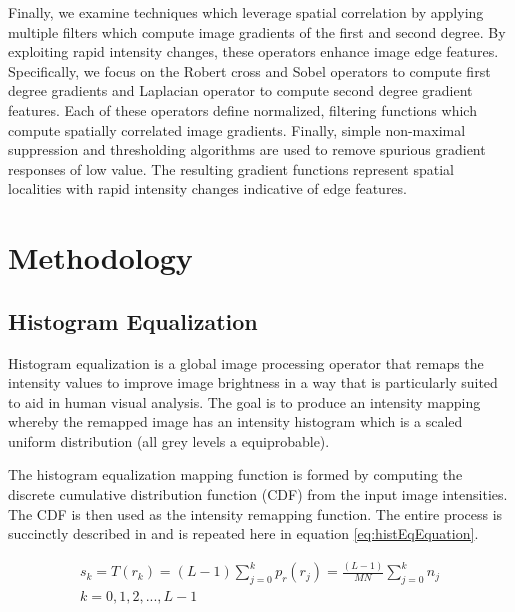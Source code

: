 \documentclass[journal]{IEEEtran}
\begin{document}
\par Finally, we examine techniques which leverage spatial correlation by applying multiple filters which compute image gradients of the first and second degree. By exploiting rapid intensity changes, these operators enhance image edge features. Specifically, we focus on the Robert cross and Sobel operators to compute first degree gradients and Laplacian operator to compute second degree gradient features. Each of these operators define normalized, filtering functions which compute spatially correlated image gradients. Finally, simple non-maximal suppression and thresholding algorithms are used to remove spurious gradient responses of low value. The resulting gradient functions represent spatial localities with rapid intensity changes indicative of edge features. \cite[p.~165-172]{Gonzalez}

\section{Methodology}
\subsection{Histogram Equalization}
\par Histogram equalization is a global image processing operator that remaps the intensity values to improve image brightness in a way that is particularly suited to aid in human visual analysis. The goal is to produce an intensity mapping whereby the remapped image has an intensity histogram which is a scaled uniform distribution (all grey levels a equiprobable). \cite[p.~75]{Nixon}
\par The histogram equalization mapping function is formed by computing the discrete cumulative distribution function (CDF) from the input image intensities. The CDF is then used as the intensity remapping function. The entire process is succinctly described in \cite[p.~122-128]{Gonzalez} and is repeated here in equation \ref{eq:histEqEquation}.

\begin{multline} \label{eq:histEqEquation}
s_k = T(r_k) = (L-1)\sum_{j=0}^{k}p_r(r_j)=
\frac{(L-1)}{MN}\sum_{j=0}^{k}n_j\\
k=0,1,2,...,L-1
\end{multline}
\end{document}
